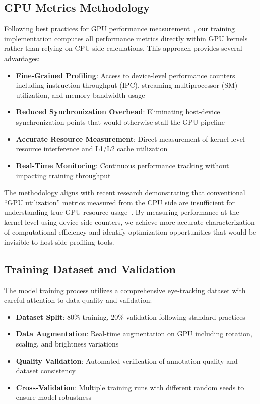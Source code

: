 \subsection{GPU Metrics Methodology}\label{subsec:gpu-metrics-methodology}

Following best practices for GPU performance measurement~\cite{elvinger2025gpu}, our training implementation computes all performance metrics directly within GPU kernels rather than relying on CPU-side calculations. This approach provides several advantages:

\begin{itemize}
\item \textbf{Fine-Grained Profiling}: Access to device-level performance counters including instruction throughput (IPC), streaming multiprocessor (SM) utilization, and memory bandwidth usage
\item \textbf{Reduced Synchronization Overhead}: Eliminating host-device synchronization points that would otherwise stall the GPU pipeline
\item \textbf{Accurate Resource Measurement}: Direct measurement of kernel-level resource interference and L1/L2 cache utilization
\item \textbf{Real-Time Monitoring}: Continuous performance tracking without impacting training throughput
\end{itemize}

The methodology aligns with recent research demonstrating that conventional ``GPU utilization'' metrics measured from the CPU side are insufficient for understanding true GPU resource usage~\cite{elvinger2025gpu}. By measuring performance at the kernel level using device-side counters, we achieve more accurate characterization of computational efficiency and identify optimization opportunities that would be invisible to host-side profiling tools.

\subsection{Training Dataset and Validation}\label{subsec:training-dataset}

The model training process utilizes a comprehensive eye-tracking dataset with careful attention to data quality and validation:

\begin{itemize}
\item \textbf{Dataset Split}: 80\% training, 20\% validation following standard practices
\item \textbf{Data Augmentation}: Real-time augmentation on GPU including rotation, scaling, and brightness variations
\item \textbf{Quality Validation}: Automated verification of annotation quality and dataset consistency
\item \textbf{Cross-Validation}: Multiple training runs with different random seeds to ensure model robustness
\end{itemize}

